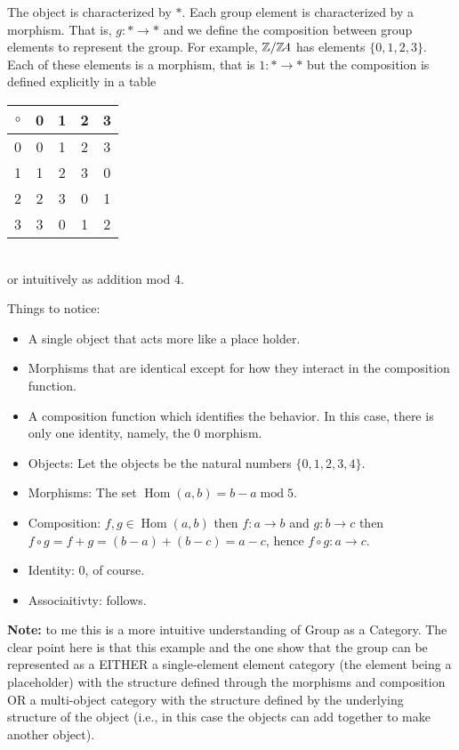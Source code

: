 \documentclass[12pt,a4paper]{report}
\begin{document}
\HLINE
\begin{example}

The object is characterized by $*$.  Each group element is characterized by a morphism.  That is, $g: * \to *$ and we define the composition between group elements to represent the group.  For example, $\mathbb{Z}/\mathbb{Z}4$ has elements $\{0, 1,2,3\}$.  Each of these elements is a morphism, that is $1: * \to *$ but the composition is defined explicitly in a table
\begin{tabular}{c|c|c|c|c}
	$\circ$ & 0 & 1 & 2 & 3 \\
	\hline
	0 & 0 & 1 & 2 & 3 \\
	\hline
	1 & 1 & 2 & 3 & 0 \\
	\hline
	2 & 2 & 3 & 0 & 1 \\
	\hline
	3 & 3 & 0 & 1 & 2 \\
\end{tabular}\\ or intuitively as addition mod 4.

Things to notice:
\begin{itemize}
	\item A single object that acts more like a place holder.
	\item Morphisms that are identical except for how they interact in the composition function.
	\item A composition function which identifies the behavior.  In this case, there is only one identity, namely, the 0 morphism.
\end{itemize}
\end{example}

\HLINE

\begin{example}

\begin{itemize}
	\item Objects: Let the objects be the natural numbers $\{0,1,2,3,4\}$.
	\item Morphisms: The set $\operatorname{Hom}(a,b) = b -a\operatorname{mod} 5$.
	\item Composition: $f,g \in \operatorname{Hom}(a,b)$ then $f: a \to b$ and $g : b \to c$ then $f\circ g = f + g = (b-a)+(b-c) = a-c$, hence $f\circ g: a \to c$.
	\item Identity: 0, of course.
	\item Associaitivty: follows.\\
\end{itemize}

\textbf{Note: }to me this is a more intuitive understanding of Group as a Category.  The clear point here is that this example and the one show that the group can be represented as a EITHER a single-element element category (the element being a placeholder) with the structure defined through the morphisms and composition OR a multi-object category with the structure defined by the underlying structure of the object (i.e., in this case the objects can add together to make another object).

\end{example}
\end{document}
